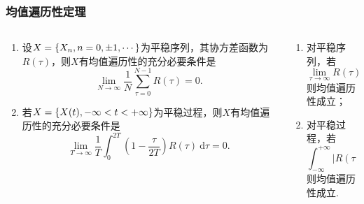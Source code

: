 \begin{frame}
    \frametitle{均值遍历性定理}
    \begin{columns}
        \begin{column}{0.55\columnwidth}
            \begin{mytheorem}[均值遍历性定理]
                \begin{enumerate}
                    \item 设$X=\left\{X_n,n=0,\pm1,\cdots\right\}$为平稳序列，其协方差函数为$R(\tau)$，则$X$有均值遍历性的充分必要条件是
                    \begin{equation}
                        \lim_{N\to\infty}\frac1N\sum_{\tau=0}^{N-1}R(\tau)=0.
                    \end{equation}
                    \item 若$X=\left\{X(t),-\infty<t<+\infty\right\}$为平稳过程，则$X$有均值遍历性的充分必要条件是
                    \begin{equation}
                        \lim_{T\to\infty}\frac1T\int_0^{2T}\left(1-\frac{\tau}{2T}\right)R(\tau)\ \mathrm d\tau=0.
                    \end{equation}
                \end{enumerate}
            \end{mytheorem}            
        \end{column}
        \begin{column}{0.40\columnwidth}
            \begin{mycorollary}[平稳过程均值遍历性成立的充分条件]
                \begin{enumerate}
                    \item 对平稳序列，若
                    \begin{equation}
                        \displaystyle\lim_{\tau\to\infty}R(\tau)=0,
                    \end{equation}
                    则均值遍历性成立；
                    \item 对平稳过程，若
                    \begin{equation}
                        \displaystyle\int_{-\infty}^{+\infty}|R(\tau)|\ \mathrm d\tau<\infty,
                    \end{equation}
                    则均值遍历性成立.
                \end{enumerate}
            \end{mycorollary}          
        \end{column}        
    \end{columns}


\end{frame}

